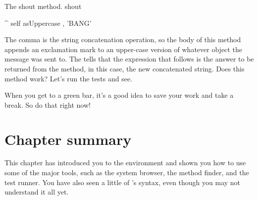\documentclass[a4paper,10pt,twoside]{book}
\begin{document}
\begin{method}[shout]{The shout method.}
shout

    ^ self asUppercase , 'BANG'
\end{method}

The comma is the string concatenation operation, so the body of this method appends an exclamation mark to an upper-case version of whatever  object the  message was sent to.
The \ct{^} tells \sq that the expression that follows is the answer to be returned from the method, in this case, the new concatenated string.
Does this method work? Let's run the tests and see.


When you get to a green bar\footnotemark, it's a good idea to save your work and take a break.
So do that right now!

\section{Chapter summary}
This chapter has introduced you to the \sq environment and shown you how to use some of the major tools, such as the system browser, the method finder, and the test runner.
You have also seen a little of \sq's syntax, even though you may not understand it all yet.
\end{document}
